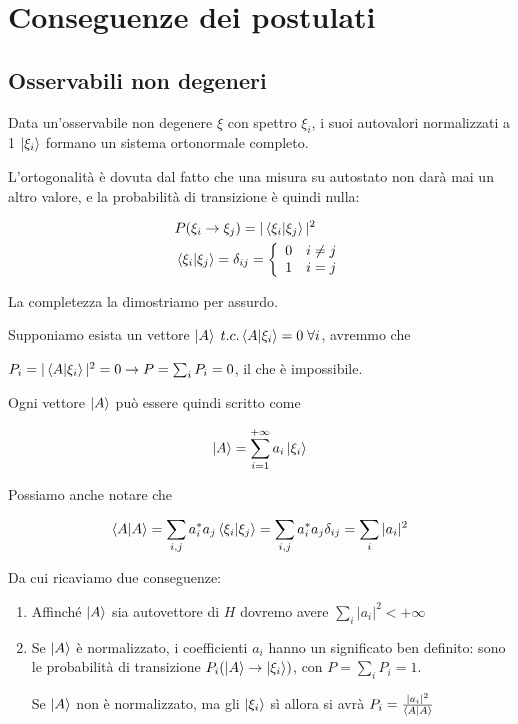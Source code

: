 \section{Conseguenze dei postulati}
 
\subsection{Osservabili non degeneri}
 
Data un'osservabile non degenere $\xi$ con spettro $\xi_i$, i suoi autovalori normalizzati a 1 $\ket{\xi_i}$ formano un sistema ortonormale completo.

\bigskip

L'ortogonalità è dovuta dal fatto che una misura su autostato non darà mai un altro valore, e la probabilità di transizione è quindi nulla:

\begin{align}
{}&P(\xi_i \rightarrow \xi_j)= |\braket{\xi_i|\xi_j}|^2 \\
&\braket{\xi_i|\xi_j} = \delta_{ij}= \left\{
\begin{array}{cc}
0 \quad i \neq j \\
1 \quad i = j
\end{array}
\right.
\end{align}


\bigskip

La completezza la dimostriamo per assurdo.

Supponiamo esista un vettore $\ket{A} \; t.c. \braket{A|\xi_i}=0 \; \forall i$, avremmo che

 $P_i= |\braket{A|\xi_i}|^2=0 \rightarrow P= \sum_i P_i=0$, il che  è impossibile.

\bigskip

Ogni vettore $\ket{A}$ può essere quindi scritto come

\begin{align}
\ket{A}= \sum_{i=1}^{+\infty} a_i \ket{\xi_i}
\end{align}

Possiamo anche notare che 

\begin{align}
\braket{A|A}= \sum_{i,j} a_i^* a_j \braket{\xi_i|\xi_j} = \sum_{i,j} a_i^* a_j \delta_{ij} = \sum_{i} |a_i|^2
\end{align}

Da cui ricaviamo due conseguenze:

\begin{enumerate}
	\item Affinché $\ket{A}$ sia autovettore di $H$ dovremo avere $\sum_{i} |a_i|^2<+\infty$
	\item Se $\ket{A}$ è normalizzato, i coefficienti $a_i$ hanno un significato ben definito: sono le probabilità di transizione $P_i(\ket{A} \rightarrow \ket{\xi_i})$, con $P=\sum_i P_i=1$.
	
	 Se $\ket{A}$ non è normalizzato, ma gli $\ket{\xi_i}$ sì allora si avrà $P_i= \frac{|a_i|^2}{\braket{A|A}}$
\end{enumerate}

